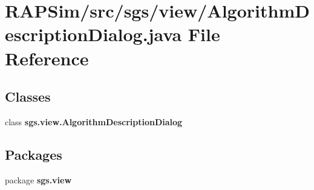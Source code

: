 \section{R\-A\-P\-Sim/src/sgs/view/\-Algorithm\-Description\-Dialog.java File Reference}
\label{_algorithm_description_dialog_8java}
\subsection*{Classes}
\begin{DoxyCompactItemize}
\item 
class {\bf sgs.\-view.\-Algorithm\-Description\-Dialog}
\end{DoxyCompactItemize}
\subsection*{Packages}
\begin{DoxyCompactItemize}
\item 
package {\bf sgs.\-view}
\end{DoxyCompactItemize}

